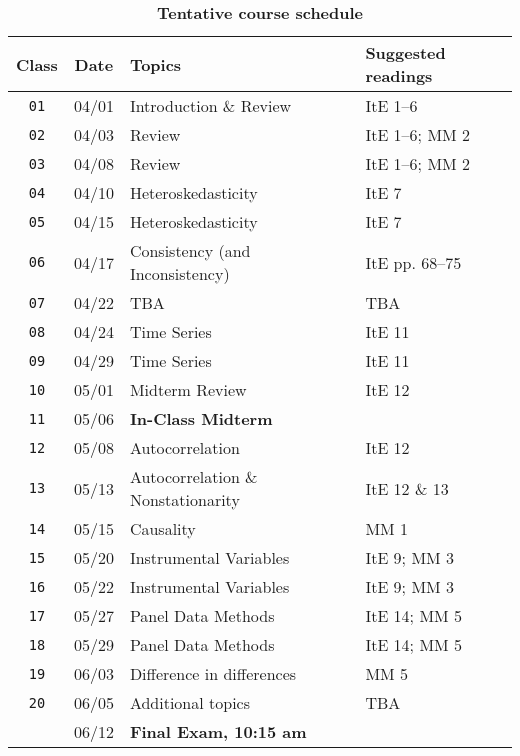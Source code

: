 \documentclass[10pt]{article}
\newcommand{\ra}[1]{\renewcommand{\arraystretch}{#1}}
\begin{document}
\begin{table}[htb]
  \caption*{\textbf{Tentative course schedule}}
  \ra{1.5}
  \begin{tabular}{@{\extracolsep{1cm}} c c l l @{}}
    \toprule
    \textbf{Class} & \textbf{Date} & \textbf{Topics} & \textbf{Suggested readings}  \\ \toprule
    \texttt{01} & 04/01 & Introduction \& Review & ItE 1--6 \\
    \texttt{02} & 04/03 & Review & ItE 1--6; MM 2 \\
    \texttt{03} & 04/08 & Review & ItE 1--6; MM 2 \\
    \texttt{04} & 04/10 & Heteroskedasticity & ItE 7 \\
    \texttt{05} & 04/15 & Heteroskedasticity & ItE 7 \\
    \texttt{06} & 04/17 & Consistency (and Inconsistency) & ItE pp. 68--75  \\
    \texttt{07} & 04/22 & TBA & TBA \\
    \texttt{08} & 04/24 & Time Series & ItE 11  \\
    \texttt{09} & 04/29 & Time Series & ItE 11  \\
    \texttt{10} & 05/01 & Midterm Review & ItE 12 \\ \midrule
    \texttt{11} & 05/06 & \textbf{In-Class Midterm} \\ \midrule
    \texttt{12} & 05/08 & Autocorrelation & ItE 12 \\
    \texttt{13} & 05/13 & Autocorrelation \& Nonstationarity & ItE 12 \& 13 \\
    \texttt{14} & 05/15 & Causality & MM 1 \\
    \texttt{15} & 05/20 & Instrumental Variables & ItE 9; MM 3 \\
    \texttt{16} & 05/22 & Instrumental Variables & ItE 9; MM 3 \\
    \texttt{17} & 05/27 & Panel Data Methods & ItE 14; MM 5 \\
    \texttt{18} & 05/29 & Panel Data Methods & ItE 14; MM 5 \\
    \texttt{19} & 06/03 & Difference in differences & MM 5 \\
    \texttt{20} & 06/05 & Additional topics & TBA \\ \midrule
    \texttt{  } & 06/12 & \textbf{Final Exam, 10:15 am} & \\
    \bottomrule
  \end{tabular}
\end{table}
\end{document}

